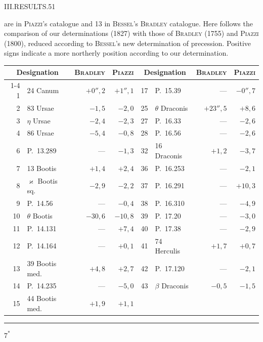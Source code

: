 \clearpage
\noindent\mbox{}\hfill III.\quad RESULTS.\hfill 51\par
{} are in \textsc{Piazzi}'s catalogue and 13 in \textsc{Bessel}'s \textsc{Bradley} catalogue. Here follows the comparison of our determinations (1827) with those of \textsc{Bradley} (1755) and \textsc{Piazzi} (1800), reduced according to \textsc{Bessel}'s new determination of precession. Positive signs indicate a more northerly position according to our determination.
\begin{center}
{\small\setlength{\tabcolsep}{4pt}
\begin{tabular}{r|l|r|r||r|l|r|r}
\multicolumn{2}{c|}{Designation}&\textsc{Bradley}&\textsc{Piazzi}&\multicolumn{2}{c|}{Designation}&\textsc{Bradley}&\textsc{Piazzi}\\\cline{1-4}\cline{5-8}
1&24 Canum&$+0''{,}2$&$+1''{,}1$&17&P.\ 15.39&—&$-0''{,}7$\\
2&83 Ursae&$-1{,}5$&$-2{,}0$&25&$\theta$ Draconis&$+23''{,}5$&$+8{,}6$\\
3&$\eta$ Ursae&$-2{,}4$&$-2{,}3$&27&P.\ 16.33&—&$-2{,}6$\\
4&86 Ursae&$-5{,}4$&$-0{,}8$&28&P.\ 16.56&—&$-2{,}6$\\
6&P.\ 13.289&—&$-1{,}3$&32&16 Draconis&$+1{,}2$&$-3{,}7$\\
7&13 Bootis&$+1{,}4$&$+2{,}4$&36&P.\ 16.253&—&$-2{,}1$\\
8&$\varkappa$ Bootis sq.&$-2{,}9$&$-2{,}2$&37&P.\ 16.291&—&$+10{,}3$\\
9&P.\ 14.56&—&$-0{,}4$&38&P.\ 16.310&—&$-4{,}9$\\
10&$\theta$ Bootis&$-30{,}6$&$-10{,}8$&39&P.\ 17.20&—&$-3{,}0$\\
11&P.\ 14.131&—&$+7{,}4$&40&P.\ 17.38&—&$-2{,}9$\\
12&P.\ 14.164&—&$+0{,}1$&41&74 Herculis&$+1{,}7$&$+0{,}7$\\
13&39 Bootis med.&$+4{,}8$&$+2{,}7$&42&P.\ 17.120&—&$-2{,}1$\\
14&P.\ 14.235&—&$-5{,}0$&43&$\beta$ Draconis&$-0{,}5$&$-1{,}5$\\
15&44 Bootis med.&$+1{,}9$&$+1{,}1$&&&&
\end{tabular}}
\end{center}
\vspace{14mm}
\begin{center}\rule{.25\textwidth}{.4pt}\end{center}
\noindent\hfill $7^*$\par
